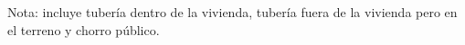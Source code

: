 Nota: incluye tubería dentro de la vivienda, tubería fuera de la vivienda pero en el terreno y chorro público.